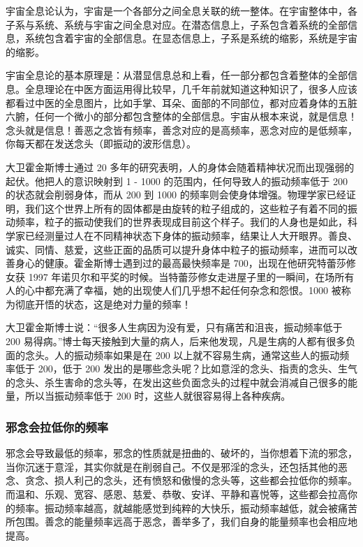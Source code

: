 \documentclass[fontset=founder]{ctexart}
\begin{document}
宇宙全息论认为，宇宙是一个各部分之间全息关联的统一整体。在宇宙整体中，各子系与系统、系统与宇宙之间全息对应。在潜态信息上，子系包含着系统的全部信息，系统包含着宇宙的全部信息。在显态信息上，子系是系统的缩影，系统是宇宙的缩影。

宇宙全息论的基本原理是：从潜显信息总和上看，任一部分都包含着整体的全部信息。全息理论在中医方面运用得比较早，几千年前就知道这种知识了，很多人应该都看过中医的全息图片，比如手掌、耳朵、面部的不同部位，都对应着身体的五脏六腑，任何一个微小的部分都包含整体的全部信息。宇宙从根本来说，就是信息！念头就是信息！善恶之念皆有频率，善念对应的是高频率，恶念对应的是低频率，你每天都在发送念头（即振动的波形信息）。

大卫霍金斯博士通过 20 多年的研究表明，人的身体会随着精神状况而出现强弱的起伏。他把人的意识映射到 1 - 1000 的范围内，任何导致人的振动频率低于 200 的状态就会削弱身体，而从 200 到 1000 的频率则会使身体增强。物理学家已经证明，我们这个世界上所有的固体都是由旋转的粒子组成的，这些粒子有着不同的振动频率，粒子的振动使我们的世界表现成目前这个样子。我们的人身也是如此，科学家已经测量过人在不同精神状态下身体的振动频率，结果让人大开眼界。善良、诚实、同情、慈爱，这些正面的品质可以提升身体中粒子的振动频率，进而可以改善身心的健康。霍金斯博士遇到过的最高最快频率是 700，出现在他研究特蕾莎修女获 1997 年诺贝尔和平奖的时候。当特蕾莎修女走进屋子里的一瞬间，在场所有人的心中都充满了幸福，她的出现使人们几乎想不起任何杂念和怨恨。1000 被称为彻底开悟的状态，这是绝对力量的频率！

大卫霍金斯博士说：“很多人生病因为没有爱，只有痛苦和沮丧，振动频率低于 200 易得病。”博士每天接触到大量的病人，后来他发现，凡是生病的人都有很多负面的念头。人的振动频率如果是在 200 以上就不容易生病，通常这些人的振动频率低于 200，低于 200 发出的是哪些念头呢？比如意淫的念头、指责的念头、生气的念头、杀生害命的念头等，在发出这些负面念头的过程中就会消减自己很多的能量，所以当振动频率低于 200 时，这些人就很容易得上各种疾病。

\subsubsection{邪念会拉低你的频率}

邪念会导致最低的频率，邪念的性质就是扭曲的、破坏的，当你想着下流的邪念，当你沉迷于意淫，其实你就是在削弱自己。不仅是邪淫的念头，还包括其他的恶念、贪念、损人利己的念头，还有愤怒和傲慢的念头等，这些都会拉低你的频率。而温和、乐观、宽容、感恩、慈爱、恭敬、安详、平静和喜悦等，这些都会拉高你的频率。振动频率越高，就越能感觉到纯粹的大快乐，振动频率越低，就会被痛苦所包围。善念的能量频率远高于恶念，善举多了，我们自身的能量频率也会相应地提高。
\end{document}
